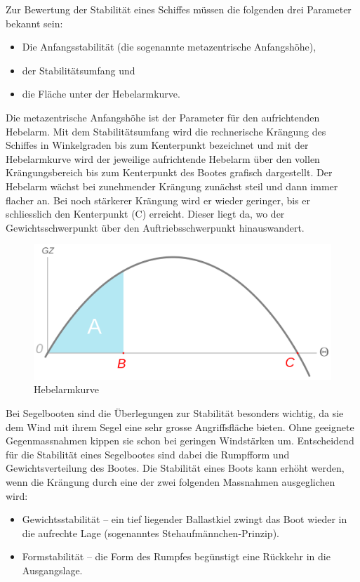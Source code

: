 Zur Bewertung der Stabilität eines Schiffes müssen die folgenden drei Parameter bekannt sein: 
\begin{itemize}
    \item Die Anfangsstabilität (die sogenannte metazentrische Anfangshöhe),
    \item der Stabilitätsumfang und
    \item die Fläche unter der Hebelarmkurve.
\end{itemize}
Die metazentrische Anfangshöhe ist der Parameter für den aufrichtenden Hebelarm. Mit dem Stabilitätsumfang wird die rechnerische Krängung des Schiffes in Winkelgraden bis zum Kenterpunkt bezeichnet und mit der Hebelarmkurve wird der jeweilige aufrichtende Hebelarm über den vollen Krängungsbereich bis zum Kenterpunkt des Bootes grafisch dargestellt.
Der Hebelarm wächst bei zunehmender Krängung zunächst steil und dann immer flacher an. Bei noch stärkerer Krängung wird er wieder geringer, bis er schliesslich den Kenterpunkt (C) erreicht. Dieser liegt da, wo der Gewichtsschwerpunkt über den Auftriebsschwerpunkt hinauswandert. \cite{noauthor_stabilitat_2023}

\begin{figure}[H]
    \centering
    \includegraphics[width=0.5\linewidth]{Stability_curve_NT.svg.png}
    \caption{Hebelarmkurve}
    \label{fig:enter-label}
\end{figure}
Bei Segelbooten sind die Überlegungen zur Stabilität besonders wichtig, da sie dem Wind mit ihrem Segel eine sehr grosse Angriffsfläche bieten. Ohne geeignete Gegenmassnahmen kippen sie schon bei geringen Windstärken um. Entscheidend für die Stabilität eines Segelbootes sind dabei die Rumpfform und Gewichtsverteilung des Bootes. Die Stabilität eines Boots kann erhöht werden, wenn die Krängung durch eine der zwei folgenden Massnahmen ausgeglichen wird:
\begin{itemize}
    \item Gewichtsstabilität – ein tief liegender Ballastkiel zwingt das Boot wieder in die aufrechte Lage (sogenanntes Stehaufmännchen-Prinzip).
    \item Formstabilität – die Form des Rumpfes begünstigt eine Rückkehr in die Ausgangslage.
\end{itemize}
